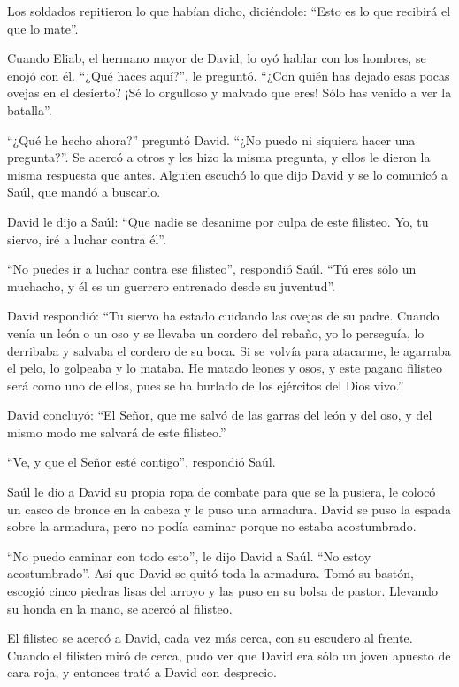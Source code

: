  Los soldados repitieron lo que habían dicho, diciéndole:
``Esto es lo que recibirá el que lo mate''.

 Cuando Eliab, el hermano mayor de David, lo oyó hablar con
los hombres, se enojó con él. ``¿Qué haces aquí?'', le preguntó. ``¿Con
quién has dejado esas pocas ovejas en el desierto? ¡Sé lo orgulloso y
malvado que eres! Sólo has venido a ver la batalla''.

 ``¿Qué he hecho ahora?'' preguntó David. ``¿No puedo ni
siquiera hacer una pregunta?''.  Se acercó a otros y les
hizo la misma pregunta, y ellos le dieron la misma respuesta que antes.
 Alguien escuchó lo que dijo David y se lo comunicó a Saúl,
que mandó a buscarlo.

 David le dijo a Saúl: ``Que nadie se desanime por culpa de
este filisteo. Yo, tu siervo, iré a luchar contra él''.

 ``No puedes ir a luchar contra ese filisteo'', respondió
Saúl. ``Tú eres sólo un muchacho, y él es un guerrero entrenado desde su
juventud''.

 David respondió: ``Tu siervo ha estado cuidando las ovejas
de su padre. Cuando venía un león o un oso y se llevaba un cordero del
rebaño,  yo lo perseguía, lo derribaba y salvaba el cordero
de su boca. Si se volvía para atacarme, le agarraba el pelo, lo golpeaba
y lo mataba.  He matado leones y osos, y este pagano
filisteo será como uno de ellos, pues se ha burlado de los ejércitos del
Dios vivo.''

 David concluyó: ``El Señor, que me salvó de las garras del
león y del oso, y del mismo modo me salvará de este filisteo.''

``Ve, y que el Señor esté contigo'', respondió Saúl.

 Saúl le dio a David su propia ropa de combate para que se
la pusiera, le colocó un casco de bronce en la cabeza y le puso una
armadura.  David se puso la espada sobre la armadura, pero
no podía caminar porque no estaba acostumbrado.

``No puedo caminar con todo esto'', le dijo David a Saúl. ``No estoy
acostumbrado''. Así que David se quitó toda la armadura. 
Tomó su bastón, escogió cinco piedras lisas del arroyo y las puso en su
bolsa de pastor. Llevando su honda en la mano, se acercó al filisteo.

 El filisteo se acercó a David, cada vez más cerca, con su
escudero al frente.  Cuando el filisteo miró de cerca, pudo
ver que David era sólo un joven apuesto de cara roja, y entonces trató a
David con desprecio.

